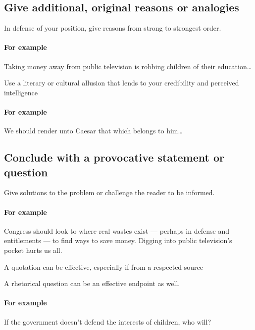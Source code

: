 \subsection{Give additional, original reasons or analogies}

\begin{itemize*}
	\item In defense of your position, give reasons from strong to strongest order. 
	
\paragraph{For example} Taking money away from public television is robbing children of their education\ldots

	\item Use a literary or cultural allusion that lends to your credibility and perceived intelligence 
	
\paragraph{For example} We should render unto Caesar that which belongs to him\ldots
\end{itemize*}

\subsection{Conclude with a provocative statement or question}

\begin{itemize*}
	\item Give solutions to the problem or challenge the reader to be informed.
	
	\paragraph{For example} Congress should look to where real wastes exist --- perhaps in defense and entitlements --- to find ways to save money. Digging into public television's pocket hurts us all.
	
	\item A quotation can be effective, especially if from a respected source

	\item A rhetorical question can be an effective endpoint as well.
	
	\paragraph{For example} If the government doesn't defend the interests of children, who will?
\end{itemize*}



